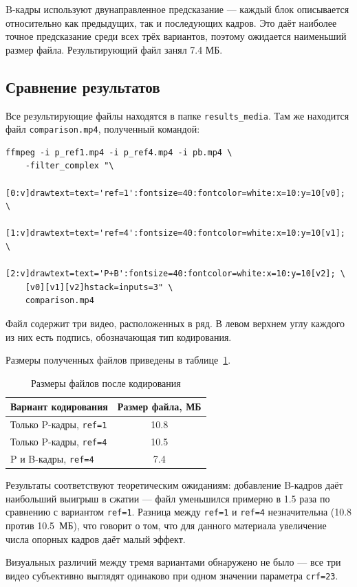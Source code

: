 \documentclass[a4paper,12pt]{article}
\begin{document}
B-кадры используют двунаправленное предсказание — каждый блок
описывается относительно как предыдущих, так и последующих кадров.
Это даёт наиболее точное предсказание среди всех трёх вариантов,
поэтому ожидается наименьший размер файла.
Результирующий файл занял 7.4 МБ.

\subsection{Сравнение результатов}

Все результирующие файлы находятся в папке \texttt{results\_media}.
Там же находится файл \texttt{comparison.mp4}, полученный командой:

\begin{verbatim}
ffmpeg -i p_ref1.mp4 -i p_ref4.mp4 -i pb.mp4 \
    -filter_complex "\
    [0:v]drawtext=text='ref=1':fontsize=40:fontcolor=white:x=10:y=10[v0]; \
    [1:v]drawtext=text='ref=4':fontsize=40:fontcolor=white:x=10:y=10[v1]; \
    [2:v]drawtext=text='P+B':fontsize=40:fontcolor=white:x=10:y=10[v2]; \
    [v0][v1][v2]hstack=inputs=3" \
    comparison.mp4
\end{verbatim}

Файл содержит три видео, расположенных в ряд. В левом верхнем углу
каждого из них есть подпись, обозначающая тип кодирования.

Размеры полученных файлов приведены в таблице~\ref{tab:sizes}.

\begin{table}[h]
\centering
\begin{tabular}{|l|c|}
\hline
\textbf{Вариант кодирования} & \textbf{Размер файла, МБ} \\
\hline
Только P-кадры, \texttt{ref=1} & 10.8 \\
Только P-кадры, \texttt{ref=4} & 10.5 \\
P и B-кадры, \texttt{ref=4}    & 7.4  \\
\hline
\end{tabular}
\caption{Размеры файлов после кодирования}
\label{tab:sizes}
\end{table}

Результаты соответствуют теоретическим ожиданиям: добавление B-кадров
даёт наибольший выигрыш в сжатии — файл уменьшился примерно в 1.5 раза
по сравнению с вариантом \texttt{ref=1}. Разница между \texttt{ref=1}
и \texttt{ref=4} незначительна (10.8 против 10.5~МБ), что говорит о том,
что для данного материала увеличение числа опорных кадров даёт малый
эффект.

Визуальных различий между тремя вариантами обнаружено не было —
все три видео субъективно выглядят одинаково при одном значении
параметра \texttt{crf=23}.
\end{document}
